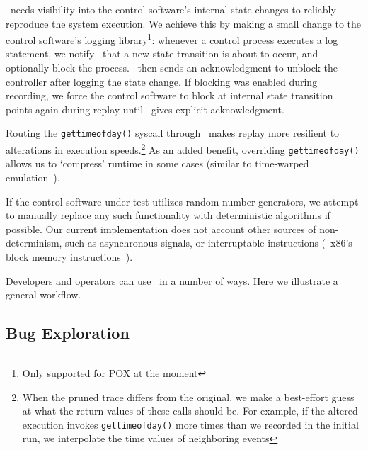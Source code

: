 \projectname~needs visibility into the control software's internal state
changes to reliably reproduce the system execution. We achieve this by
making a
small change to the control software's logging library\footnote{Only supported
for POX at the moment}: whenever a control process executes a log
statement, we notify \projectname~that a new state transition
is about to occur, and optionally block the process. \projectname~then sends
an acknowledgment to unblock the controller after logging the state change. If blocking was enabled
during recording, we force the control software to block at internal state
transition points again during replay
until \projectname~gives explicit acknowledgment.

Routing the {\tt gettimeofday()} syscall
through \projectname~makes replay more resilient to alterations in execution
speeds.\footnote{When the pruned trace differs from the original, we make a
best-effort guess at what the return values of these calls should be. For example,
if the altered execution invokes {\tt gettimeofday()} more times than we recorded
in the initial run, we interpolate the time values of neighboring events}
As an added benefit, overriding {\tt gettimeofday()} allows us to `compress'
runtime in some cases (similar to time-warped emulation~\cite{Gupta06toinfinity}).

If the control software under test utilizes random number generators, we
attempt to manually replace any such functionality with deterministic
algorithms if possible. Our current implementation does not account other sources of non-determinism,
such as asynchronous signals,
or interruptable instructions (\eg~x86's block memory
instructions~\cite{Dunlap:2002:REI:844128.844148}).


Developers and operators can use \projectname~in a number of ways. Here we
illustrate a general workflow.

\subsection{Bug Exploration}

